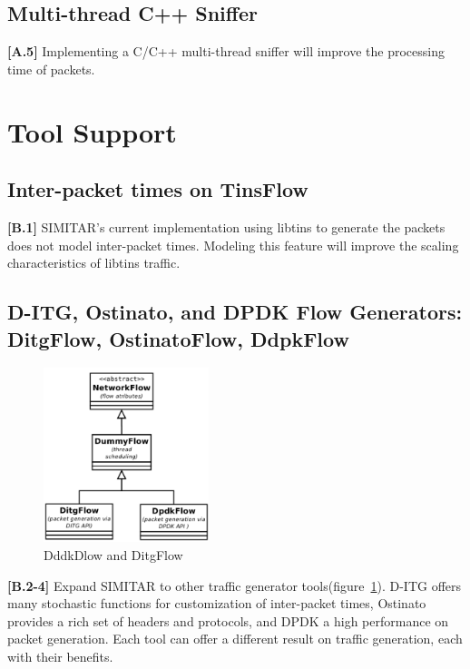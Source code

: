 \subsection{Multi-thread C++ Sniffer}

\textbf{[A.5]} Implementing a C/C++ multi-thread sniffer will improve the processing time of packets. 



\section{Tool Support}

\subsection{Inter-packet times on TinsFlow}

\textbf{[B.1]} SIMITAR’s current implementation using libtins to generate the packets does not model inter-packet times. Modeling this feature will improve the scaling characteristics of libtins traffic.

\subsection{D-ITG, Ostinato, and DPDK Flow Generators: DitgFlow, OstinatoFlow, DdpkFlow}

\begin{figure}[!ht]
    \centering
    \includegraphics[height=2.0in]{figures/ch6/dpdk-flow}
    \caption{DddkDlow and DitgFlow}
    \label{fig:dpdk-flow}
\end{figure}


\textbf{[B.2-4]} Expand SIMITAR to other traffic generator tools(figure~\ref{fig:dpdk-flow}). D-ITG offers many stochastic functions for customization of inter-packet times, Ostinato provides a rich set of headers and protocols, and DPDK a high performance on packet generation. Each tool can offer a different result on traffic generation,  each with their benefits. 

